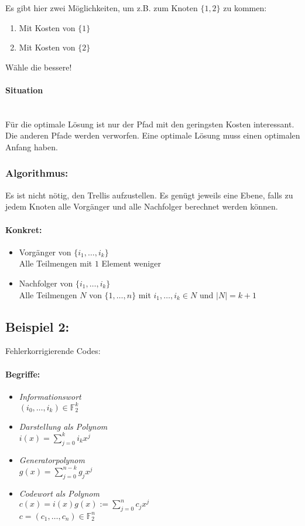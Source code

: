 \documentclass[a4paper]{scrartcl}
\begin{document}
Es gibt hier zwei Möglichkeiten, um z.B. zum Knoten $\{1,2\}$ zu kommen:
\begin{enumerate}
\item Mit Kosten von $\{1\}$
\item Mit Kosten von $\{2\}$
\end{enumerate}
Wähle die bessere!
\paragraph{Situation} \\
Für die optimale Lösung ist nur der Pfad mit den geringsten Kosten interessant. Die anderen Pfade werden verworfen. Eine optimale Lösung muss einen optimalen Anfang haben.
\subsubsection{Algorithmus:}
Es ist nicht nötig, den Trellis aufzustellen. Es genügt jeweils eine Ebene, falls zu jedem Knoten alle Vorgänger und alle Nachfolger berechnet werden können.
\paragraph{Konkret:}
\begin{itemize}
\item Vorgänger von $\{i_1,\ldots ,i_k\}$\\
Alle Teilmengen mit $1$ Element weniger
\item Nachfolger von $\{i_1,\ldots ,i_k\}$\\
Alle Teilmengen $N$ von $\{1,\ldots ,n\}$ mit $i_1,\ldots ,i_k\in N$ und $|N|=k+1$
\end{itemize}

\subsection{Beispiel 2:} 
Fehlerkorrigierende Codes:
\paragraph{Begriffe:}
\begin{itemize}
\item \em{Informationswort}\\
$(i_0,\ldots,i_k)\in \mathbb{F}_2^k$
\item \em{Darstellung als Polynom}\\
$i(x)=\sum_{j=0}^k i_k x^j$
\item \em{Generatorpolynom}\\
$g(x)=\sum_{j=0}^{n-k} g_j x^j$
\item \em{Codewort als Polynom}\\
$c(x)=i(x) g(x) := \sum_{j=0}^n c_j x^j$\\
$c=(c_1,\ldots,c_n) \in \mathbb{F}_2^n$
\end{itemize}
\end{document}
